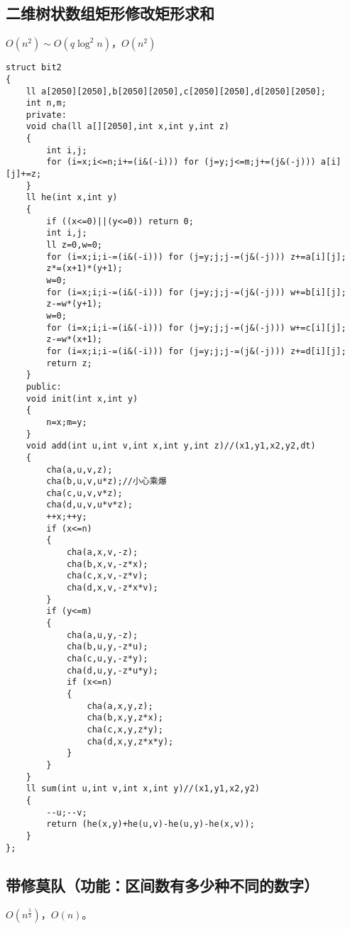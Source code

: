 \documentclass{ctexart}
\begin{document}
\subsection{二维树状数组矩形修改矩形求和}

$O(n^2)\sim O(q\log^2n)$，$O(n^2)$

\begin{lstlisting}
struct bit2
{
	ll a[2050][2050],b[2050][2050],c[2050][2050],d[2050][2050];
	int n,m;
	private:
	void cha(ll a[][2050],int x,int y,int z)
	{
		int i,j;
		for (i=x;i<=n;i+=(i&(-i))) for (j=y;j<=m;j+=(j&(-j))) a[i][j]+=z;
	}
	ll he(int x,int y)
	{
		if ((x<=0)||(y<=0)) return 0;
		int i,j;
		ll z=0,w=0;
		for (i=x;i;i-=(i&(-i))) for (j=y;j;j-=(j&(-j))) z+=a[i][j];
		z*=(x+1)*(y+1);
		w=0;
		for (i=x;i;i-=(i&(-i))) for (j=y;j;j-=(j&(-j))) w+=b[i][j];
		z-=w*(y+1);
		w=0;
		for (i=x;i;i-=(i&(-i))) for (j=y;j;j-=(j&(-j))) w+=c[i][j];
		z-=w*(x+1);
		for (i=x;i;i-=(i&(-i))) for (j=y;j;j-=(j&(-j))) z+=d[i][j];
		return z;
	}
	public:
	void init(int x,int y)
	{
		n=x;m=y;
	}
	void add(int u,int v,int x,int y,int z)//(x1,y1,x2,y2,dt)
	{
		cha(a,u,v,z);
		cha(b,u,v,u*z);//小心乘爆
		cha(c,u,v,v*z);
		cha(d,u,v,u*v*z);
		++x;++y;
		if (x<=n)
		{
			cha(a,x,v,-z);
			cha(b,x,v,-z*x);
			cha(c,x,v,-z*v);
			cha(d,x,v,-z*x*v);
		}
		if (y<=m)
		{
			cha(a,u,y,-z);
			cha(b,u,y,-z*u);
			cha(c,u,y,-z*y);
			cha(d,u,y,-z*u*y);
			if (x<=n)
			{
				cha(a,x,y,z);
				cha(b,x,y,z*x);
				cha(c,x,y,z*y);
				cha(d,x,y,z*x*y);
			}
		}
	}
	ll sum(int u,int v,int x,int y)//(x1,y1,x2,y2)
	{
		--u;--v;
		return (he(x,y)+he(u,v)-he(u,y)-he(x,v));
	}
};
\end{lstlisting}

\subsection{带修莫队（功能：区间数有多少种不同的数字）}

$O(n^{\frac {5}{3}})$，$O(n)$。
\end{document}
